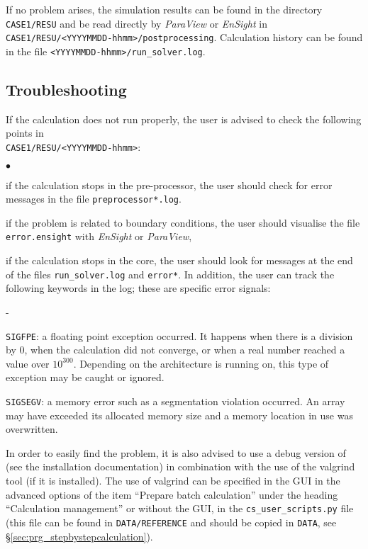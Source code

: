 If no problem arises, the simulation results can be found in the directory \texttt{CASE1/RESU} and be read directly by {\em ParaView} or {\em EnSight} in \texttt{CASE1/RESU/<YYYYMMDD-hhmm>/postprocessing}. Calculation history can be found in the file \texttt{<YYYYMMDD-hhmm>/run\_solver.log}.

\subsection{Troubleshooting}
If the calculation does not run properly, the user is advised to check the
following points in\\
\texttt{CASE1/RESU/<YYYYMMDD-hhmm>}:
\begin{list}{$\bullet$}{}
\item  if the calculation stops in the pre-processor, the user should check for error messages in the file \texttt{preprocessor*.log}.
\item if the problem is related to boundary conditions, the user should visualise the file \texttt{error.ensight} with {\em EnSight} or {\em ParaView},
\item if the calculation stops in the \CS core, the user should look for messages at the end of the files \texttt{run\_solver.log} and \texttt{error*}. In addition, the user can track the following keywords in the log; these are specific error signals:
  \begin{list}{-}{}
  \item  \texttt{SIGFPE}: a floating point exception occurred. It happens when there is a division by 0, when the calculation did not converge, or when a real number reached a value over $10^{300}$. Depending on the architecture \CS is running
on, this type of exception may be caught or ignored.
  \item  \texttt{SIGSEGV}: a memory error such as a segmentation violation occurred. An array may have exceeded its allocated memory size and a memory location in use was overwritten.
  \end{list}
In order to easily find the problem, it is also advised to use a debug version of \CS (see the installation documentation) in combination with the use of the valgrind tool (if it is installed). The use of valgrind can be specified in the GUI in the advanced options of the item ``Prepare batch calculation'' under the heading ``Calculation management'' or without the GUI, in the \texttt{cs\_user\_scripts.py} file (this file can be found in \texttt{DATA/REFERENCE} and should be copied in \texttt{DATA}, see \S\ref{sec:prg_stepbystepcalculation}).
\end{list}
